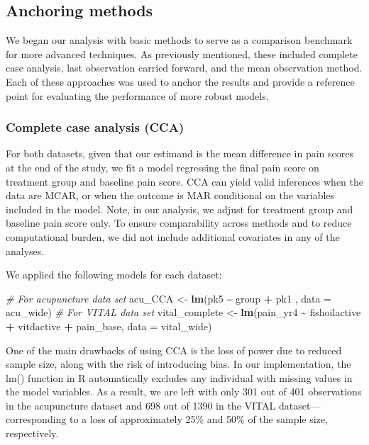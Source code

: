 \documentclass{article}
\newenvironment{Shaded}{\begin{snugshade}}{\end{snugshade}}
\newcommand{\AttributeTok}[1]{\textcolor[rgb]{0.13,0.29,0.53}{#1}}
\newcommand{\CommentTok}[1]{\textcolor[rgb]{0.56,0.35,0.01}{\textit{#1}}}
\newcommand{\FunctionTok}[1]{\textcolor[rgb]{0.13,0.29,0.53}{\textbf{#1}}}
\newcommand{\NormalTok}[1]{#1}
\newcommand{\OtherTok}[1]{\textcolor[rgb]{0.56,0.35,0.01}{#1}}
\newcommand{\SpecialCharTok}[1]{\textcolor[rgb]{0.81,0.36,0.00}{\textbf{#1}}}
\begin{document}
\subsection{Anchoring methods}\label{anchoring-methods}

We began our analysis with basic methods to serve as a comparison
benchmark for more advanced techniques. As previously mentioned, these
included complete case analysis, last observation carried forward, and
the mean observation method. Each of these approaches was used to anchor
the results and provide a reference point for evaluating the performance
of more robust models.

\subsubsection{Complete case analysis
(CCA)}\label{complete-case-analysis-cca}

For both datasets, given that our estimand is the mean difference in
pain scores at the end of the study, we fit a model regressing the final
pain score on treatment group and baseline pain score. CCA can yield
valid inferences when the data are MCAR, or when the outcome is MAR
conditional on the variables included in the model. Note, in our
analysis, we adjust for treatment group and baseline pain score only. To
ensure comparability across methods and to reduce computational burden,
we did not include additional covariates in any of the analyses.

We applied the following models for each dataset:

\begin{Shaded}
\begin{Highlighting}[]
\CommentTok{\# For acupuncture data set}
\NormalTok{acu\_CCA }\OtherTok{\textless{}{-}} \FunctionTok{lm}\NormalTok{(pk5 }\SpecialCharTok{\textasciitilde{}}\NormalTok{ group }\SpecialCharTok{+}\NormalTok{ pk1 , }\AttributeTok{data =}\NormalTok{ acu\_wide)}
\CommentTok{\# For VITAL data set}
\NormalTok{vital\_complete }\OtherTok{\textless{}{-}} \FunctionTok{lm}\NormalTok{(pain\_yr4 }\SpecialCharTok{\textasciitilde{}}\NormalTok{ fishoilactive }\SpecialCharTok{+}\NormalTok{ vitdactive }\SpecialCharTok{+}\NormalTok{ pain\_base, }\AttributeTok{data =}\NormalTok{ vital\_wide)}
\end{Highlighting}
\end{Shaded}

One of the main drawbacks of using CCA is the loss of power due to
reduced sample size, along with the risk of introducing bias. In our
implementation, the lm() function in R automatically excludes any
individual with missing values in the model variables. As a result, we
are left with only 301 out of 401 observations in the acupuncture
dataset and 698 out of 1390 in the VITAL dataset---corresponding to a
loss of approximately 25\% and 50\% of the sample size, respectively.
\end{document}
